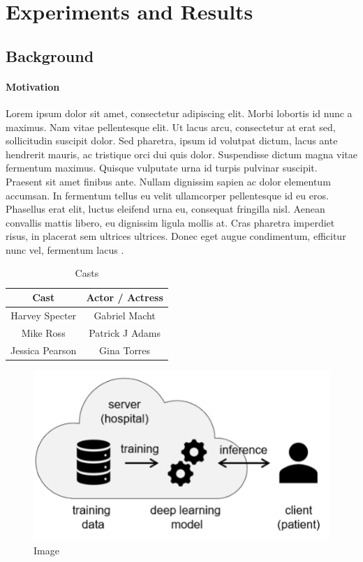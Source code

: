 \chapter{Experiments and Results}

\section{Background}

\subsubsection{Motivation}

Lorem ipsum dolor sit amet, consectetur adipiscing elit. Morbi lobortis id nunc a maximus. Nam vitae pellentesque elit. Ut lacus arcu, consectetur at erat sed, sollicitudin suscipit dolor. Sed pharetra, ipsum id volutpat dictum, lacus ante hendrerit mauris, ac tristique orci dui quis dolor. Suspendisse dictum magna vitae fermentum maximus. Quisque vulputate urna id turpis pulvinar suscipit. Praesent sit amet finibus ante. Nullam dignissim sapien ac dolor elementum accumsan. In fermentum tellus eu velit ullamcorper pellentesque id eu eros. Phasellus erat elit, luctus eleifend urna eu, consequat fringilla nisl. Aenean convallis mattis libero, eu dignissim ligula mollis at. Cras pharetra imperdiet risus, in placerat sem ultrices ultrices. Donec eget augue condimentum, efficitur nunc vel, fermentum lacus \cite{book}.

\begin{table}[!ht]
    \centering
    \begin{tabular}{@{}cc@{}}
    \toprule
    Cast            & Actor / Actress \\ \midrule
    Harvey Specter  & Gabriel Macht   \\
    Mike Ross       & Patrick J Adams \\
    Jessica Pearson & Gina Torres     \\ \bottomrule
    \end{tabular}
    \caption{Casts}
\end{table}

\begin{figure}[!ht]
    \centering
    \includegraphics{figures/diag.png}
    \caption{Image}
\end{figure}

